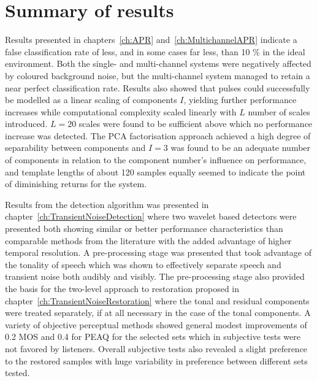 \section{Summary of results}
Results presented in chapters~\ref{ch:APR} and~\ref{ch:MultichannelAPR} indicate a false classification rate of less, and in some cases far less, than 10 \% in the ideal environment. Both the single- and multi-channel systems were negatively affected by coloured background noise, but the multi-channel system managed to retain a near perfect classification rate. Results also showed that pulses could successfully be modelled as a linear scaling of components $I$, yielding further performance increases while computational complexity scaled linearly with $L$ number of scales introduced. $L=20$ scales were found to be sufficient above which no performance increase was detected. The PCA factorisation approach achieved a high degree of separability between components and $I=3$ was found to be an adequate number of components in relation to the component number's influence on performance, and template lengths of about 120 samples equally seemed to indicate the point of diminishing returns for the system.

Results from the detection algorithm was presented in chapter~\ref{ch:TransientNoiseDetection} where two wavelet based detectors were presented both showing similar or better performance characteristics than comparable methods from the literature with the added advantage of higher temporal resolution. A pre-processing stage was presented that took advantage of the tonality of speech which was shown to effectively separate speech and transient noise both audibly and visibly. The pre-processing stage also provided the basis for the two-level approach to restoration proposed in chapter~\ref{ch:TransientNoiseRestoration} where the tonal and residual components were treated separately, if at all necessary in the case of the tonal components. A variety of objective perceptual methods showed general modest improvements of 0.2 MOS and 0.4 for PEAQ for the selected sets which in subjective tests were not favored by listeners. Overall subjective tests also revealed a slight preference to the restored samples with huge variability in preference between different sets tested.

